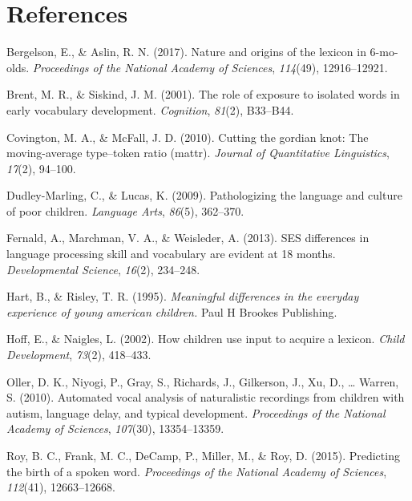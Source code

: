 \documentclass[floatsintext,man]{apa6}
\theoremstyle{definition}
\theoremstyle{definition}
\theoremstyle{definition}
\theoremstyle{remark}
\begin{document}
\newpage

\section{References}\label{references}

\setlength{\parindent}{-0.5in} \setlength{\leftskip}{0.5in}

\hypertarget{refs}{}
\hypertarget{ref-bergelson2017nature}{}
Bergelson, E., \& Aslin, R. N. (2017). Nature and origins of the lexicon
in 6-mo-olds. \emph{Proceedings of the National Academy of Sciences},
\emph{114}(49), 12916--12921.

\hypertarget{ref-brent2001role}{}
Brent, M. R., \& Siskind, J. M. (2001). The role of exposure to isolated
words in early vocabulary development. \emph{Cognition}, \emph{81}(2),
B33--B44.

\hypertarget{ref-covington2010cutting}{}
Covington, M. A., \& McFall, J. D. (2010). Cutting the gordian knot: The
moving-average type--token ratio (mattr). \emph{Journal of Quantitative
Linguistics}, \emph{17}(2), 94--100.

\hypertarget{ref-dudley2009pathologizing}{}
Dudley-Marling, C., \& Lucas, K. (2009). Pathologizing the language and
culture of poor children. \emph{Language Arts}, \emph{86}(5), 362--370.

\hypertarget{ref-fernald2013ses}{}
Fernald, A., Marchman, V. A., \& Weisleder, A. (2013). SES differences
in language processing skill and vocabulary are evident at 18 months.
\emph{Developmental Science}, \emph{16}(2), 234--248.

\hypertarget{ref-hart1995meaningful}{}
Hart, B., \& Risley, T. R. (1995). \emph{Meaningful differences in the
everyday experience of young american children.} Paul H Brookes
Publishing.

\hypertarget{ref-hoff2002children}{}
Hoff, E., \& Naigles, L. (2002). How children use input to acquire a
lexicon. \emph{Child Development}, \emph{73}(2), 418--433.

\hypertarget{ref-oller2010automated}{}
Oller, D. K., Niyogi, P., Gray, S., Richards, J., Gilkerson, J., Xu, D.,
\ldots{} Warren, S. (2010). Automated vocal analysis of naturalistic
recordings from children with autism, language delay, and typical
development. \emph{Proceedings of the National Academy of Sciences},
\emph{107}(30), 13354--13359.

\hypertarget{ref-roy2015predicting}{}
Roy, B. C., Frank, M. C., DeCamp, P., Miller, M., \& Roy, D. (2015).
Predicting the birth of a spoken word. \emph{Proceedings of the National
Academy of Sciences}, \emph{112}(41), 12663--12668.
\end{document}
